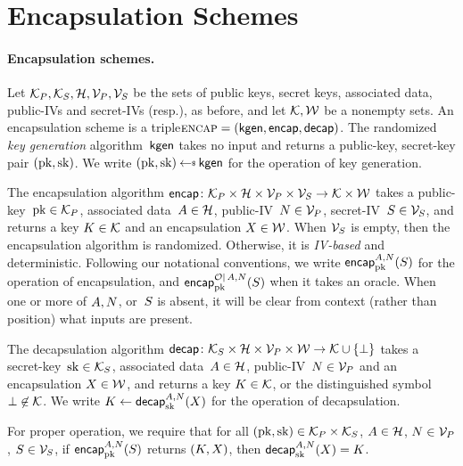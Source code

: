 \section{Encapsulation Schemes}
\label{sec:kem}

\paragraph{Encapsulation schemes. }
Let $\pubkeys, \seckeys, \adata, \pubivs, \secivs$ be the sets of public keys, secret keys, associated data, public-IVs and secret-IVs (resp.), as before, and let $\keys,\wraps$ be a nonempty sets.
%
An encapsulation scheme is a triple$\encapscheme=(\pkgen,\encap,\decap)$.   The randomized \emph{key generation} algorithm~$\pkgen$ takes no input and returns a public-key, secret-key pair $(\pk,\sk)$.  We write $(\pk,\sk)\getsr\pkgen$ for the operation of key generation. 

The encapsulation algorithm $\encap \colon \pubkeys \times \adata \times \pubivs \times \secivs \to \keys \times \wraps$ takes a public-key~$\pk\in\pubkeys$, associated data~$\header \in \adata$, public-IV~$\pubiv \in \pubivs$, secret-IV~$\seciv \in \secivs$, and returns a key $K \in \keys$ and an encapsulation $X \in \wraps$. 
When $\secivs$ is empty, then the encapsulation algorithm is randomized.  Otherwise, it is \emph{IV-based} and deterministic.  Following our notational conventions, we write $\encapprim{\pk}{\header,\pubiv}{\seciv}$ for the operation of encapsulation, and $\encapprimO{\pk}{\header,\pubiv}{\seciv}{\mathcal{O}}$ when it takes an oracle.  When one or more of $\header,\pubiv$, or~$\seciv$ is absent, it will be clear from context (rather than position) what inputs are present.

The decapsulation algorithm $\decap \colon \seckeys \times \adata \times \pubivs \times \wraps \to \keys \cup \{\bot\}$ takes a secret-key~$\sk\in\seckeys$, associated data~$\header \in \adata$, public-IV~$\pubiv \in \pubivs$ and an encapsulation $X \in \wraps$, and returns a key $K \in \keys$, or the distinguished symbol~$\bot \not\in \keys$.  We write $K \gets \decapprim{\sk}{\header,\pubiv}{\wrap}$ for the operation of decapsulation. 

For proper operation, we require that for all $(\pk,\sk)\in\pubkeys\times\seckeys$, $\header\in\adata$, $\pubiv\in\pubivs$, $\seciv\in\secivs$, if $\encapprim{\pk}{\header,\pubiv}{\seciv}$ returns $(K,\wrap)$, then $\decapprim{\sk}{\header,\pubiv}{\wrap}=K$.

